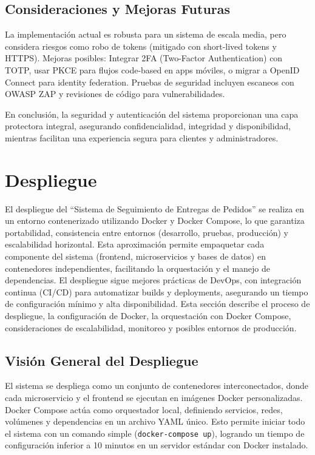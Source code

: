 \documentclass[a4paper,12pt]{article}
\begin{document}
\subsection{Consideraciones y Mejoras Futuras}
La implementación actual es robusta para un sistema de escala media, pero considera riesgos como robo de tokens (mitigado con short-lived tokens y HTTPS). Mejoras posibles: Integrar 2FA (Two-Factor Authentication) con TOTP, usar PKCE para flujos code-based en apps móviles, o migrar a OpenID Connect para identity federation. Pruebas de seguridad incluyen escaneos con OWASP ZAP y revisiones de código para vulnerabilidades.

En conclusión, la seguridad y autenticación del sistema proporcionan una capa protectora integral, asegurando confidencialidad, integridad y disponibilidad, mientras facilitan una experiencia segura para clientes y administradores.

\section{Despliegue}

El despliegue del ``Sistema de Seguimiento de Entregas de Pedidos'' se realiza en un entorno contenerizado utilizando Docker y Docker Compose, lo que garantiza portabilidad, consistencia entre entornos (desarrollo, pruebas, producción) y escalabilidad horizontal. Esta aproximación permite empaquetar cada componente del sistema (frontend, microservicios y bases de datos) en contenedores independientes, facilitando la orquestación y el manejo de dependencias. El despliegue sigue mejores prácticas de DevOps, con integración continua (CI/CD) para automatizar builds y deployments, asegurando un tiempo de configuración mínimo y alta disponibilidad. Esta sección describe el proceso de despliegue, la configuración de Docker, la orquestación con Docker Compose, consideraciones de escalabilidad, monitoreo y posibles entornos de producción.

\subsection{Visión General del Despliegue}
El sistema se despliega como un conjunto de contenedores interconectados, donde cada microservicio y el frontend se ejecutan en imágenes Docker personalizadas. Docker Compose actúa como orquestador local, definiendo servicios, redes, volúmenes y dependencias en un archivo YAML único. Esto permite iniciar todo el sistema con un comando simple (\texttt{docker-compose up}), logrando un tiempo de configuración inferior a 10 minutos en un servidor estándar con Docker instalado.
\end{document}
